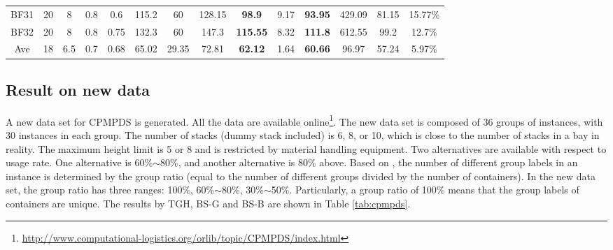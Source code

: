 \documentclass[review,3p,times,authoryear,12pt]{elsarticle}
\begin{document}
\begin{table}[htbp]
\begin{tabular}{c|c|c|c|c|c|c|c|c|c|c|c|c|c}
    BF31  & 20 & 8  & 0.8 & 0.6  & 115.2 & 60    & 128.15 & \textbf{98.9} & 9.17    & \textbf{93.95} & 429.09  & 81.15 & 15.77\%\\
    BF32  & 20 & 8  & 0.8 & 0.75 & 132.3 & 60    & 147.3  & \textbf{115.55}& 8.32   & \textbf{111.8} & 612.55  & 99.2  & 12.7\%\\
    \hline
    Ave   & 18 & 6.5& 0.7 & 0.68 & 65.02 & 29.35 & 72.81  & \textbf{62.12}& 1.64    & \textbf{60.66} & 96.97   & 57.24 & 5.97\%\\
   \hline
\end{tabular}
\end{table}

\subsection {Result on new data}
A new data set for CPMPDS is generated. All the data are available online\footnote{\url{http://www.computational-logistics.org/orlib/topic/CPMPDS/index.html}}. The new data set is composed of 36 groups of instances, with 30 instances in each group. The number of stacks (dummy stack included) is 6, 8, or 10, which is close to the number of stacks in a bay in reality. The maximum height limit is 5 or 8 and is restricted by material handling equipment. Two alternatives are available with respect to usage rate. One alternative is 60\%$\sim$80\%, and another alternative is 80\% above. Based on \cite{BF2012}, the number of different group labels in an instance is determined by the group ratio (equal to the number of different groups divided by the number of containers). In the new data set, the group ratio has three ranges: 100\%, 60\%$\sim$80\%, 30\%$\sim$50\%. Particularly, a group ratio of 100\% means that the group labels of containers are unique. The results by TGH, BS-G and BS-B are shown in Table \ref{tab:cpmpds}.
\end{document}
